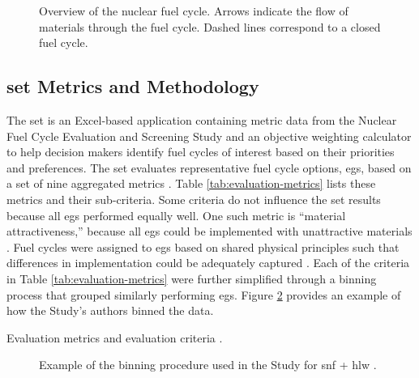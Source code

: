 \begin{figure}[htbp!]
  \centering
  \resizebox{\columnwidth}{!}{}
  \caption{Overview of the nuclear fuel cycle. Arrows indicate the flow of
  materials through the fuel cycle. Dashed lines correspond to a closed fuel
  cycle.}
  \label{fig:nuclear-fuel-cycle}
\end{figure}

\subsection{\ac{set} Metrics and Methodology}

The \ac{set} is an Excel-based application containing metric data from the
Nuclear Fuel Cycle Evaluation and Screening Study \cite{wigeland_nuclear_2014}
and an objective weighting calculator to help decision makers identify fuel
cycles of interest based on their priorities and preferences. The \ac{set}
evaluates representative fuel cycle options, \acp{eg}, based on a set of nine
aggregated metrics \cite{wigeland_nuclear_2014}. Table
\ref{tab:evaluation-metrics} lists these metrics and their sub-criteria. Some
criteria do not influence the \ac{set} results because all \acp{eg} performed
equally well. One such metric is ``material attractiveness,'' because all
\acp{eg} could be implemented with unattractive materials
\cite{wigeland_nuclear_2014-1}. Fuel cycles were assigned to \acp{eg} based on
shared physical principles such that differences in implementation could be
adequately captured \cite{wigeland_nuclear_2014}.  
Each of the criteria in Table \ref{tab:evaluation-metrics} were further
simplified through a binning process that grouped similarly performing \acp{eg}.
Figure \ref{fig:bin-plot} provides an example of how the Study's authors binned
the data.

\begin{table}[htbp!]
    \centering
    \caption{Evaluation metrics and evaluation criteria
    \cite{wigeland_nuclear_2014-2}.}
    \label{tab:evaluation-metrics}
    \resizebox{\columnwidth}{!}{}
\end{table}


\begin{figure}[htbp!]
    \centering
    \resizebox{\columnwidth}{!}{}    
    \caption{Example of the binning procedure used in the Study for \ac{snf} +
    \ac{hlw} \cite{wigeland_nuclear_2014-1}.}
    \label{fig:bin-plot}
\end{figure}

